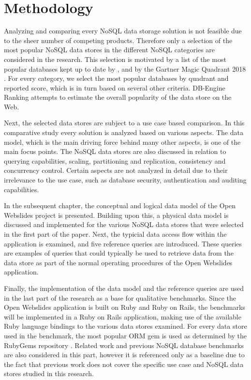 
\chapter{Methodology}
\label{ch:methodology}

Analyzing and comparing every NoSQL data storage solution is not feasible due to the sheer number of competing products.
Therefore only a selection of the most popular NoSQL data stores in the different NoSQL categories are considered in the research.
This selection is motivated by a list of the most popular databases kept up to date by \textcite{DBEngine2018}, and by the Gartner Magic Quadrant 2018 \autocite{Gartner2018}.
For every category, we select the most popular databases by quadrant and reported score, which is in turn based on several other criteria.
DB-Engine Ranking attempts to estimate the overall popularity of the data store on the Web.

Next, the selected data stores are subject to a use case based comparison.
In this comparative study every solution is analyzed based on various aspects.
The data model, which is the main driving force behind many other aspects, is one of the main focus points.
The NoSQL data stores are also discussed in relation to querying capabilities, scaling, partitioning and replication, consistency and concurrency control.
Certain aspects are not analyzed in detail due to their irrelevance to the use case, such as database security, authentication and auditing capabilities.

In the subsequent chapter, the conceptual and logical data model of the Open Webslides project is presented.
Building upon this, a physical data model is discussed and implemented for the various NoSQL data stores that were selected in the first part of the paper.
Next, the typicial data access flow within the application is examined, and five reference queries are introduced.
These queries are examples of queries that could typically be used to retrieve data from the data store as part of the normal operating procedures of the Open Webslides application.

\clearpage{}

Finally, the implementation of the data model and the reference queries are used in the last part of the research as a base for qualitative benchmarks.
Since the Open Webslides application is built on Ruby and Ruby on Rails, the benchmarks will be implemented in a Ruby on Rails application, making use of the available Ruby language bindings to the various data stores examined.
For every data store used in the benchmark, the most popular ORM gem is used as determined by the RubyGems repository \autocite{RubyGems2003}.
Related work and previous NoSQL database benchmarks are also considered in this part, however it is referenced only as a baseline due to the fact that previous work does not cover the specific use case and NoSQL data stores studied in this research.
